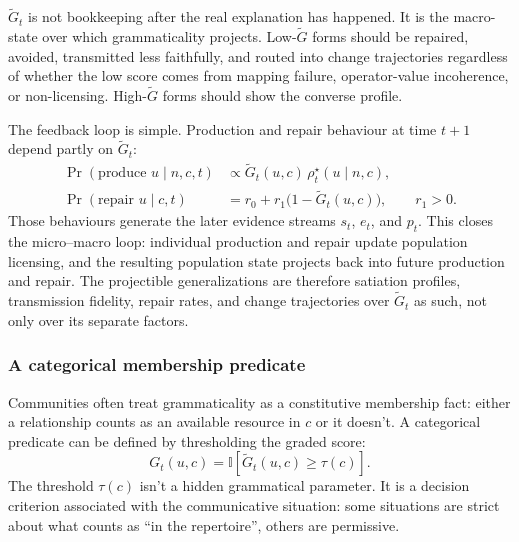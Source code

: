 \documentclass[12pt,letterpaper]{article}
\begin{document}
$\widetilde{G}_t$ is not bookkeeping after the real explanation has happened.
It is the macro-state over which grammaticality projects. Low-$\widetilde{G}$
forms should be repaired, avoided, transmitted less faithfully, and routed into
change trajectories regardless of whether the low score comes from mapping
failure, operator-value incoherence, or non-licensing. High-$\widetilde{G}$
forms should show the converse profile.

The feedback loop is simple. Production and repair behaviour at time $t+1$
depend partly on $\widetilde{G}_t$:
\begin{align*}
\Pr(\text{produce }u\mid n,c,t) &\propto
\widetilde{G}_t(u,c)\,\rho_t^\star(u\mid n,c),\\
\Pr(\text{repair }u\mid c,t) &= r_0+r_1\bigl(1-\widetilde{G}_t(u,c)\bigr),
\qquad r_1>0.
\end{align*}
Those behaviours generate the later evidence streams $s_t$, $e_t$, and $p_t$.
This closes the micro--macro loop: individual production and repair update
population licensing, and the resulting population state projects back into
future production and repair. The projectible generalizations are therefore
satiation profiles, transmission fidelity, repair rates, and change
trajectories over $\widetilde{G}_t$ as such, not only over its separate factors.

\subsubsection{A categorical membership predicate}

Communities often treat grammaticality as a constitutive membership fact:
either a relationship counts as an available resource in $c$ or it doesn't.
A categorical predicate can be defined by thresholding the graded score:
\begin{equation*}
G_t(u,c)=\mathbb{I}\!\left[\widetilde{G}_t(u,c)\ge \tau(c)\right].
\end{equation*}
The threshold $\tau(c)$ isn't a hidden grammatical parameter. It is a decision
criterion associated with the communicative situation: some situations are
strict about what counts as \enquote{in the repertoire}, others are permissive.
\end{document}
